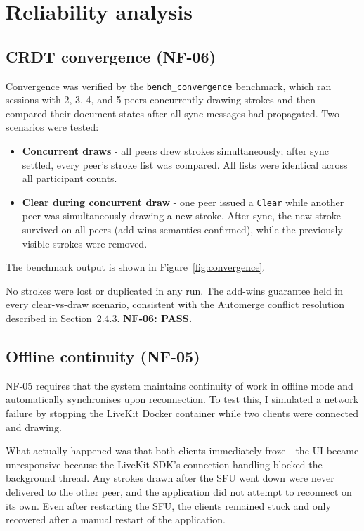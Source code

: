 \documentclass[a4paper,11pt,twoside]{report}
\theoremstyle{definition}
\begin{document}
\section{Reliability analysis}

\subsection{CRDT convergence (NF-06)}

Convergence was verified by the \texttt{bench\_convergence} benchmark, which ran sessions
with 2, 3, 4, and 5 peers concurrently drawing strokes and then compared their document
states after all sync messages had propagated. Two scenarios were tested:

\begin{itemize}
    \item \textbf{Concurrent draws} - all peers drew strokes simultaneously; after sync
    settled, every peer's stroke list was compared. All lists were identical across all
    participant counts.
    \item \textbf{Clear during concurrent draw} - one peer issued a \texttt{Clear} while
    another peer was simultaneously drawing a new stroke. After sync, the new stroke
    survived on all peers (add-wins semantics confirmed), while the previously visible
    strokes were removed.
\end{itemize}

The benchmark output is shown in Figure~\ref{fig:convergence}.

No strokes were lost or duplicated in any run. The add-wins guarantee held in every
clear-vs-draw scenario, consistent with the Automerge conflict resolution described in
Section~2.4.3. \textbf{NF-06: PASS.}

\subsection{Offline continuity (NF-05)}

NF-05 requires that the system maintains continuity of work in offline mode and
automatically synchronises upon reconnection. To test this, I simulated a network failure 
by stopping the
LiveKit Docker container while two clients were connected and drawing.

What actually happened was that both clients immediately froze—the UI became
unresponsive because the LiveKit SDK's connection handling blocked the background thread.
Any strokes drawn after the SFU went down were never delivered to the other peer, and
the application did not
attempt to reconnect on its own. Even after restarting the SFU, the clients remained 
stuck and only recovered after a manual restart of the application.
\end{document}
